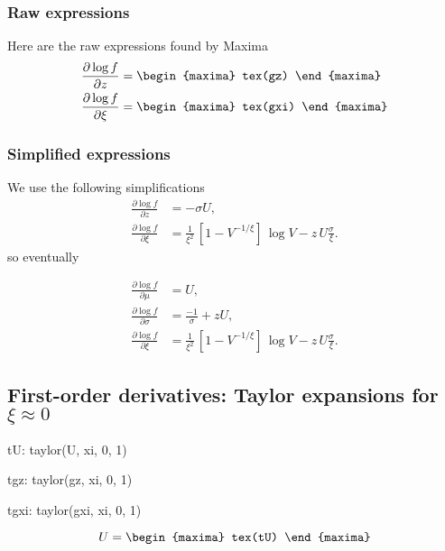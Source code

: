 \subsubsection*{Raw expressions}
Here are the raw expressions found by Maxima
{\color{MonVertF}
  \begin{align*}
  \frac{\partial \log f}{\partial z}
  &=
    \begin{maxima}
      tex(gz)
    \end{maxima}
  \\
  \frac{\partial \log f}{\partial \xi}
  &=
    \begin{maxima}
      tex(gxi)
    \end{maxima}
  \end{align*}
}

\subsubsection*{Simplified expressions}

We use the following simplifications
\begin{align*} 
  \frac{\partial \log f}{\partial z}
  &= - \sigma U, %
  \\
  \frac{\partial \log f}{\partial \xi}
  &= \frac{1}{\xi^2} \, [1 - V^{-1/\xi}]  \, \log V - z \, U \frac{\sigma}{\xi}.
\end{align*}
so eventually

{\color{red}
\begin{align*} 
  \frac{\partial \log f}{\partial \mu}
  &= U,
  \\
  \frac{\partial \log f}{\partial \sigma}
  &= \frac{-1}{\sigma} + z U,
  \\
  \frac{\partial \log f}{\partial \xi}
  &= \frac{1}{\xi^2} \, [1 - V^{-1/\xi}]  \, \log V - z \, U \frac{\sigma}{\xi}.
\end{align*}
}

\subsection{First-order derivatives: Taylor expansions for $\xi \approx 0$}
\begin{maxima}
  tU: taylor(U, xi, 0, 1)
\end{maxima}
\begin{maxima}
  tgz: taylor(gz, xi, 0, 1)
\end{maxima}
\begin{maxima}
  tgxi: taylor(gxi, xi, 0, 1)
\end{maxima}
{\color{MonVertF}
$$
U =
\begin{maxima}
  tex(tU)
\end{maxima}
$$
}

